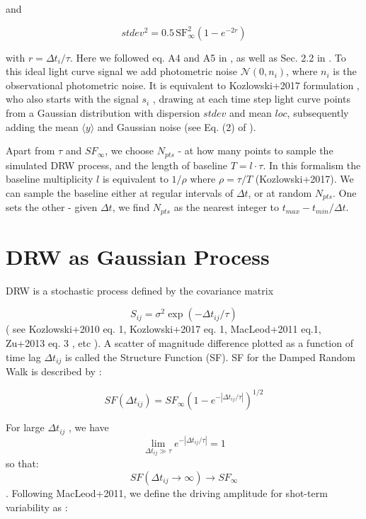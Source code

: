\documentclass[fleqn,usenatbib]{mnras}  %
\begin{document}
and 

\begin{equation}
stdev^{2} =  0.5  \, \mathrm{SF}_{\infty}^{2} \left( 1 - e ^{  - 2 r  }  \right)
\end{equation}

with  $r = \Delta t_{i} / \tau$.   Here we followed eq. A4 and A5 in \cite{kelly2009}, as well as Sec. 2.2 in \cite{macleod2010}.  To this ideal light curve signal we add photometric noise $\mathcal{N}(0,n_{i})$, where $n_{i}$ is the observational photometric noise.  It is equivalent to  Kozlowski+2017 formulation , who also starts with the signal $s_{i}$ , drawing at each time step light curve points from  a Gaussian distribution with dispersion  $stdev$ and mean $loc$, subsequently adding the mean $\langle y \rangle$ and Gaussian noise (see Eq. (2) of \cite{kozlowski2017a}).


Apart from $\tau$ and $SF_{\infty}$, we choose $N_{pts}$ - at how many points to sample the simulated DRW process, and the length of baseline $T = l \cdot \tau$.  In this formalism the baseline multiplicity $l$  is equivalent to $1 / \rho$ where  $\rho = \tau / T $  (Kozlowski+2017). We can sample the baseline either at regular intervals of $\Delta t$, or at random $N_{pts}$. One sets the other - given  $\Delta t$,  we find $N_{pts}$ as the nearest integer to $t_{max} - t_{min} / \Delta t $. 


\section{DRW as Gaussian Process}
DRW is a stochastic process defined by the covariance matrix  

\begin{equation}
S_{ij} = \sigma^{2} \exp{ \left(   -  \Delta t_{ij} / \tau \right)}
\end{equation}
( see Kozlowski+2010 eq. 1, Kozlowski+2017 eq. 1,  MacLeod+2011 eq.1, Zu+2013 eq. 3 , etc ).  A scatter of magnitude difference plotted as a function of time lag $\Delta t_{ij} $ is called the Structure Function (SF).  SF for the Damped Random Walk is described by  :

\begin{equation}
SF(\Delta t_{ij} ) = SF_{\infty} \left( 1 - e^{-|\Delta t_{ij} /\tau|} \right) ^{1/2}
\end{equation}

For large $\Delta t_{ij} $ , we have    
\[ \lim_{\Delta t_{ij} \gg \tau} e^{-|\Delta t_{ij} /\tau| }= 1 \]
so that: \[   SF(\Delta t_{ij} \to \infty)\xrightarrow[]{} SF_{\infty} \].  Following MacLeod+2011,  we define the driving amplitude for shot-term variability as :
\end{document}
